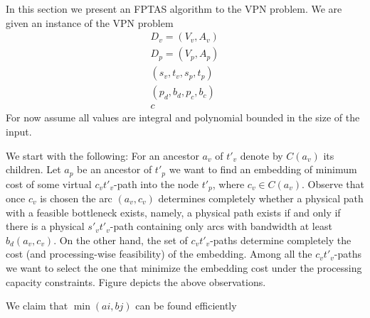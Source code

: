 In this section we present an FPTAS algorithm to the VPN problem.
We are given an instance of the VPN problem 
\begin{align}
D_v = (V_v, A_v)			\\
D_p = (V_p, A_p)			\\
(s_v, t_v, s_p, t_p)	\\
(p_d, b_d, p_c, b_c)	\\
c
\end{align}
For now assume all values are integral and polynomial bounded in the size of the input.

We start with the following:
For an ancestor $a_v$ of $t'_v$ denote by $C(a_v)$ its children.
Let $a_p$ be an ancestor of $t'_p$ we want to find an embedding of minimum cost
of some virtual $c_vt'_v$-path into the node $t'_p$, 
where $c_v \in C(a_v)$.
Observe that once $c_v$ is chosen the arc $(a_v, c_v)$ determines completely
whether a physical path with a feasible bottleneck exists, namely, a physical
path exists if and only if there is a physical $s'_vt'_v$-path containing only
arcs with bandwidth at least $b_d(a_v, c_v)$.
On the other hand, the set of $c_vt'_v$-paths
determine completely the cost (and processing-wise feasibility) of the embedding.
Among all the $c_vt'_v$-paths we want to select the one that minimize the
embedding cost under the processing capacity constraints.
Figure \todo{} depicts the above observations.

\begin{figure}[ht]
\centering

\end{figure}

We claim that $\min(ai, bj)$ can be found efficiently 


 
